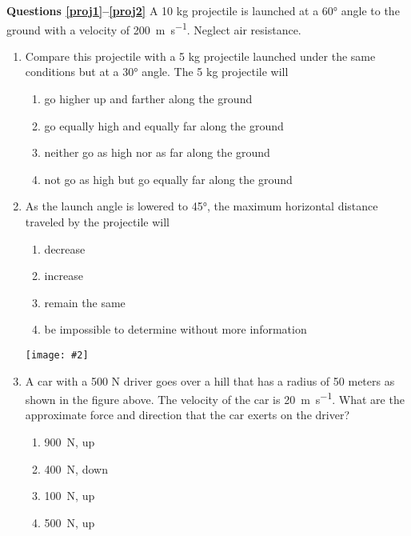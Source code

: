 \documentclass[11pt]{article}
\newcommand{\pic}[2]{\texttt{[image: \#2]}}
\begin{document}
\raggedcolumns
\begin{multicols}{2}
  \textbf{Questions \ref{proj1}--\ref{proj2}} A 10 kg projectile is launched at
  a \ang{60} angle to the ground with a velocity of
  \SI{200}{\metre\per\second}. Neglect air resistance.
  \begin{enumerate}[leftmargin=18pt]
  \item Compare this projectile with a 5 kg projectile launched under the same
    conditions but at a \ang{30} angle. The 5 kg projectile will
    \label{proj1}
    \begin{enumerate}[nosep,leftmargin=18pt,label=(\Alph*)]
    \item go higher up and farther along the ground
    \item go equally high and equally far along the ground
    \item neither go as high nor as far along the ground
    \item not go as high but go equally far along the ground
    \end{enumerate}
    \vspace{.7in}
    
  \item As the launch angle is lowered to \ang{45}, the maximum horizontal
    distance traveled by the projectile will
    \label{proj2}
    \begin{enumerate}[nosep,leftmargin=18pt,label=(\Alph*)]
    \item decrease
    \item increase
    \item remain the same
    \item be impossible to determine without more information
    \end{enumerate}
    \vspace{.7in}
    
    \begin{center}
      \pic{.3}{IMG_20200810_093039201}
    \end{center}
  \item A car with a 500 N driver goes over a hill that has a radius of 50
    meters as shown in the figure above. The velocity of the car is
    \SI{20}{\metre\per\second}. What are the approximate force and direction
    that the car exerts on the driver?
    \begin{enumerate}[nosep,leftmargin=18pt,label=(\Alph*)]
    \item\SI{900}{\newton}, up
    \item\SI{400}{\newton}, down
    \item\SI{100}{\newton}, up
    \item\SI{500}{\newton}, up
    \end{enumerate}
    

\end{enumerate}
\end{multicols}
\end{document}
